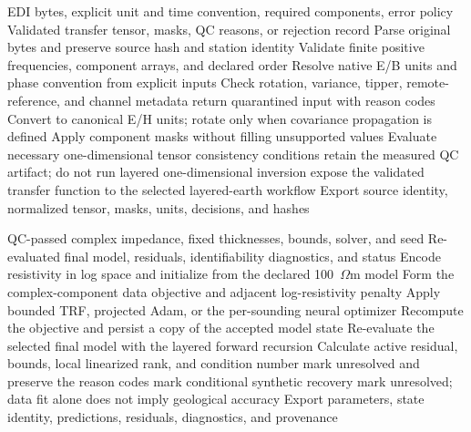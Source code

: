 \begin{algorithm}[!ht]
\caption{Validate and screen an EDI transfer-function record}
\label{alg:edi-screen}
\begin{algorithmic}[1]
\Require EDI bytes, explicit unit and time convention, required components, error policy
\Ensure Validated transfer tensor, masks, QC reasons, or rejection record
\State Parse original bytes and preserve source hash and station identity
\State Validate finite positive frequencies, component arrays, and declared order
\State Resolve native E/B units and phase convention from explicit inputs
\State Check rotation, variance, tipper, remote-reference, and channel metadata
  \State return quarantined input with reason codes
\EndIf
\State Convert to canonical E/H units; rotate only when covariance propagation is defined
\State Apply component masks without filling unsupported values
\State Evaluate necessary one-dimensional tensor consistency conditions
  \State retain the measured QC artifact; do not run layered one-dimensional inversion
\Else
  \State expose the validated transfer function to the selected layered-earth workflow
\EndIf
\State Export source identity, normalized tensor, masks, units, decisions, and hashes
\end{algorithmic}
\end{algorithm}

\begin{algorithm}[!ht]
\caption{Select a bounded layered-earth MT model}
\label{alg:mt-solve}
\begin{algorithmic}[1]
\Require QC-passed complex impedance, fixed thicknesses, bounds, solver, and seed
\Ensure Re-evaluated final model, residuals, identifiability diagnostics, and status
\State Encode resistivity in log space and initialize from the declared 100~$\Omega$m model
\State Form the complex-component data objective and adjacent log-resistivity penalty
\State Apply bounded TRF, projected Adam, or the per-sounding neural optimizer
  \State Recompute the objective and persist a copy of the accepted model state
\EndFor
\State Re-evaluate the selected final model with the layered forward recursion
\State Calculate active residual, bounds, local linearized rank, and condition number
  \State mark unresolved and preserve the reason codes
  \State mark conditional synthetic recovery
\Else
  \State mark unresolved; data fit alone does not imply geological accuracy
\EndIf
\State Export parameters, state identity, predictions, residuals, diagnostics, and provenance
\end{algorithmic}
\end{algorithm}

